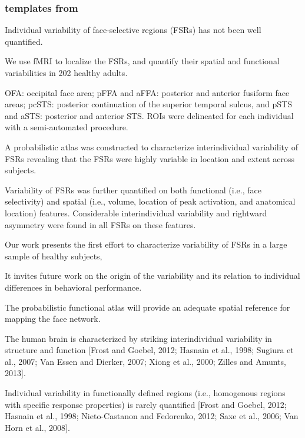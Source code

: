 \subsubsection{templates from \citet{zhen2015quantifying}}



Individual variability of face-selective regions (FSRs) has not been well
quantified.

%
We use fMRI to localize the FSRs, and quantify their spatial and functional
variabilities in 202 healthy adults.

%
OFA: occipital face area;
%
pFFA and aFFA: posterior and anterior fusiform face areas;
%
pcSTS: posterior continuation of the superior temporal sulcus, and
%
pSTS and aSTS: posterior and anterior STS.
%
ROIs were delineated for each individual with a semi-automated procedure.

%
A probabilistic atlas was constructed to characterize interindividual
variability of FSRs revealing that the FSRs were highly variable in location and
extent across subjects.

%
Variability of FSRs was further quantified on both functional (i.e., face
selectivity) and spatial (i.e., volume, location of peak activation, and
anatomical location) features.
%
Considerable interindividual variability and rightward asymmetry were found in
all FSRs on these features.

%
Our work presents the first effort to characterize variability of FSRs in a
large sample of healthy subjects,

It invites future work on the origin of the variability and its relation to
individual differences in behavioral performance.

%
The probabilistic functional atlas will provide an adequate spatial reference
for mapping the face network.

The human brain is characterized by striking interindividual variability in
structure and function [Frost and Goebel, 2012; Hasnain et al., 1998; Sugiura et
al., 2007; Van Essen and Dierker, 2007; Xiong et al., 2000; Zilles and Amunts,
2013].

Individual variability in functionally defined regions (i.e., homogenous regions
with specific response properties) is rarely quantified [Frost and Goebel, 2012;
Hasnain et al., 1998; Nieto-Castanon and Fedorenko, 2012; Saxe et al., 2006; Van
Horn et al., 2008].

